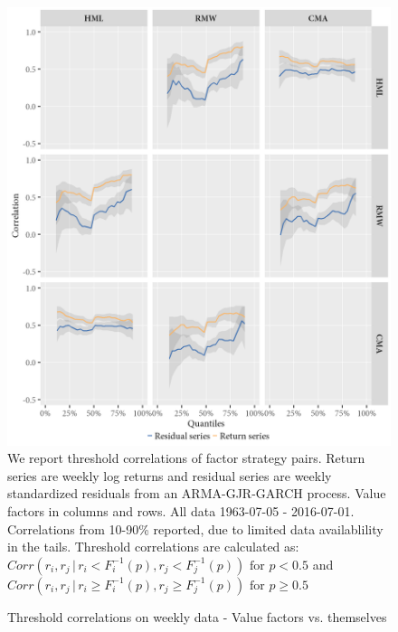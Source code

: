 \begin{figure}[H]
  \caption{Threshold correlations on weekly data - Value factors vs. themselves}
  \label{diag:thresholdvalue}
  \toprule
  \centering
  \begin{minipage}{\textwidth}
  \includegraphics[scale=1]{graphics/threshold_Value.png}  
  \bottomrule
  \vspace{3mm}
  \footnotesize
  We report threshold correlations of factor strategy pairs. Return series are weekly log returns and residual series are weekly standardized residuals from an ARMA-GJR-GARCH process. Value factors in columns and rows. All data 1963-07-05 - 2016-07-01. Correlations from 10-90\% reported, due to limited data availablility in the tails. Threshold correlations are calculated as: $Corr(r_i, r_j \,|\, r_i < F_i^{-1}(p), r_j < F_j^{-1}(p)) \text{ for } p < 0.5$ and $Corr(r_i, r_j \,|\, r_i \geq F_i^{-1}(p), r_j \geq F_j^{-1}(p)) \text{ for } p \geq 0.5$
  \end{minipage}
\end{figure}

